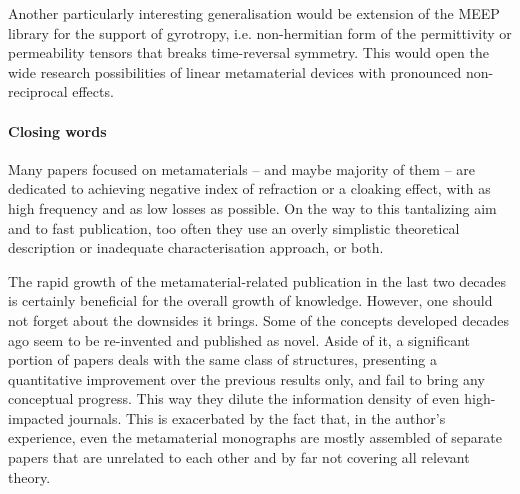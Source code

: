 Another particularly interesting generalisation would be extension of the MEEP library for the support of gyrotropy, i.e. non-hermitian form of the permittivity or permeability tensors that breaks time-reversal symmetry. This would open the wide research possibilities of linear metamaterial devices with pronounced non-reciprocal effects.



\paragraph{Closing words} 
Many papers focused on metamaterials -- and maybe majority of them -- are dedicated to achieving negative index of refraction or a cloaking effect, with as high frequency and as low losses as possible.
On the way to this tantalizing aim and to fast publication, too often they use an overly simplistic theoretical description or inadequate characterisation approach, or both. %

The rapid growth of the metamaterial-related publication in the last two decades is certainly beneficial for the overall growth of knowledge. However, one should not forget about the downsides it brings. Some of the concepts developed decades ago seem to be re-invented and published as novel. Aside of it, a significant portion of papers deals with the same class of structures, presenting a quantitative improvement over the previous results only, and fail to bring any conceptual progress. This way they dilute the information density of even high-impacted journals. This is exacerbated by the fact that, in the author's experience, even the metamaterial monographs are mostly assembled of separate papers that are unrelated to each other and by far not covering all relevant theory.

